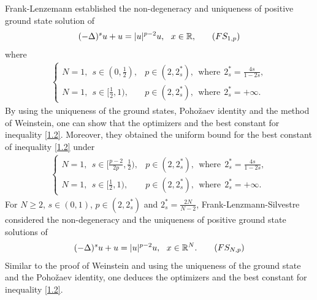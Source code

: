 \documentclass[12pt,a4paper,reqno]{amsart}
\numberwithin{equation}{section}
\begin{document}
Frank-Lenzemann \cite[Theorem 2.4]{Frank-Lenzmann2013Acta} established the non-degeneracy and uniqueness of positive ground state solution of
\begin{equation}\label{FS2}
\begin{aligned}
(-\Delta)^{s} u+u =|u|^{p-2}u, \ \ x\in\mathbb{R},
\end{aligned}
\tag{$FS_{1,p}$}
\end{equation}
where
\begin{equation*}
\begin{aligned}
\begin{cases}
N=1,~~s\in(0,\frac{1}{2}),&p\in(2,2_{s}^{*}),~~\mathrm{where}~~2_{s}^{*}=\frac{4s}{1-2s},\\
N=1,~~s\in[\frac{1}{2},1),&p\in(2,2_{s}^{*}),~~\mathrm{where}~~2_{s}^{*}=+\infty.
\end{cases}
\end{aligned}
\end{equation*}
By using the uniqueness of the ground states, Poho\v{z}aev identity and the method of Weinstein, one can show that the optimizers and the best constant for inequality \eqref{1.2}.
Moreover, they \cite[Lemma A.5]{Frank-Lenzmann2013Acta} obtained the uniform bound for the best constant of inequality \eqref{1.2} under
\begin{equation*}
\begin{aligned}
\begin{cases}
N=1,~~s\in[\frac{p-2}{2p},\frac{1}{2}),&p\in(2,2_{s}^{*}),~~\mathrm{where}~~2_{s}^{*}=\frac{4s}{1-2s},\\
N=1,~~s\in[\frac{1}{2},1),&p\in(2,2_{s}^{*}),~~\mathrm{where}~~2_{s}^{*}=+\infty.
\end{cases}
\end{aligned}
\end{equation*}
For $N\geqslant 2$, $s\in(0,1)$, $p\in(2,2_{s}^{*})$ and $2_{s}^{*}=\frac{2N}{N-2}$,
Frank-Lenzmann-Silvestre
\cite{Frank-Lenzmann-Silvestre2016CPAM} considered the non-degeneracy and the uniqueness of positive ground state solutions of
\begin{equation}\label{FS3}
\begin{aligned}
(-\Delta)^{s} u+u =|u|^{p-2}u, \ \ x\in\mathbb{R}^{N}.
\end{aligned}
\tag{$FS_{N,p}$}
\end{equation}
Similar to the proof of Weinstein and using the uniqueness of the ground state and the Poho\v{z}aev identity, one deduces the optimizers and the best constant for inequality \eqref{1.2}.
\end{document}
